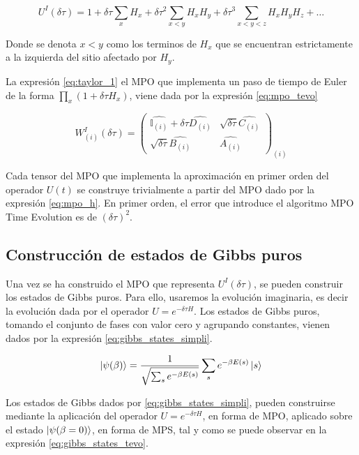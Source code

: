 \begin{equation}
U^I(\delta\tau) = 1 + \delta\tau \sum_{x} H_x + \delta\tau^2 \sum_{x<y} H_x H_y + \delta\tau^3 \sum_{x<y<z} H_x H_y H_z + \ldots
\label{eq:taylor_1}
\end{equation}

Donde se denota $x<y$ como los terminos de $H_x$ que se encuentran estrictamente a la izquierda del sitio afectado por $H_y$. 

\newpage

La expresión \ref{eq:taylor_1} el MPO que implementa un paso de tiempo de Euler de la forma $\prod_{x}(1 + \delta\tau H_{x})$, viene dada por la expresión \ref{eq:mpo_tevo}


\begin{equation}
W^{I}_{(i)}(\delta\tau) =
\begin{pmatrix}
\hat{\mathbb{I}_{(i)}} + \delta\tau \hat{D_{(i)}} & \sqrt{\delta\tau}\hat{C_{(i)}} \\
 \sqrt{\delta\tau}\hat{B_{(i)}} & \hat{A_{(i)}} 
\end{pmatrix}_{(i)}
\label{eq:mpo_tevo}
\end{equation}

Cada tensor del MPO que implementa la aproximación en primer orden del operador $U(t)$ se construye trivialmente a partir del MPO dado por la expresión \ref{eq:mpo_h}. En primer orden, el error que introduce el algoritmo MPO Time Evolution es de $(\delta\tau)^{2}$.

\subsection{Construcción de estados de Gibbs puros}

Una vez se ha construido el MPO que representa $U^{I}(\delta\tau)$, se pueden construir los estados de Gibbs puros. Para ello, usaremos la evolución imaginaria, es decir la evolución dada por el operador $U = e^{- \delta\tau H}$. Los estados de Gibbs puros, tomando el conjunto de fases con valor cero y agrupando constantes, vienen dados por la expresión \ref{eq:gibbs_states_simpli}.

\begin{equation}
    \ket{\psi(\beta)}=\frac{1}{\sqrt{\sum_s e^{-\beta E(s)}}}\sum_s e^{- \beta E(s)}\ket{s}
    \label{eq:gibbs_states_simpli}
\end{equation}

Los estados de Gibbs dados por \ref{eq:gibbs_states_simpli}, pueden construirse mediante la aplicación del operador $U = e^{- \delta\tau H}$, en forma de MPO, aplicado sobre el estado $\ket{\psi(\beta=0)}$, en forma de MPS, tal y como se puede observar en la expresión \ref{eq:gibbs_states_tevo}.

